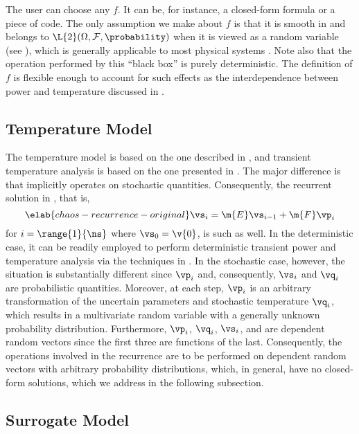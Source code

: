 The user can choose any $f$. It can be, for instance, a closed-form formula or a
piece of code. The only assumption we make about $f$ is that it is smooth in \vz
and belongs to $\L{2}(\Omega, \mathcal{F}, \probability)$ when it is viewed as a
random variable (see ), which is generally applicable
to most physical systems \cite{xiu2010}. Note also that the operation performed
by this ``black box'' is purely deterministic. The definition of $f$ is flexible
enough to account for such effects as the interdependence between power and
temperature discussed in .

\subsection{Temperature Model}

The temperature model is based on the one described in ,
and transient temperature analysis is based on the one presented in
. The major difference is that
 implicitly operates on stochastic quantities.
Consequently, the recurrent solution in , that
is,
\begin{equation} \elab{chaos-recurrence-original}
  \vs_i = \m{E} \vs_{i - 1} + \m{F} \vp_i
\end{equation}
for $i = \range{1}{\ns}$ where $\vs_0 = \v{0}$, is such as well. In the
deterministic case, it can be readily employed to perform deterministic
transient power and temperature analysis via the techniques in
. In the stochastic case, however, the
situation is substantially different since $\vp_i$ and, consequently, $\vs_i$
and $\vq_i$ are probabilistic quantities. Moreover, at each step, $\vp_i$ is an
arbitrary transformation of the uncertain parameters \vu and stochastic
temperature $\vq_i$, which results in a multivariate random variable with a
generally unknown probability distribution. Furthermore, $\vp_i$, $\vq_i$,
$\vs_i$, and \vu are dependent random vectors since the first three are
functions of the last. Consequently, the operations involved in the recurrence
are to be performed on dependent random vectors with arbitrary probability
distributions, which, in general, have no closed-form solutions, which we
address in the following subsection.

\subsection{Surrogate Model}

